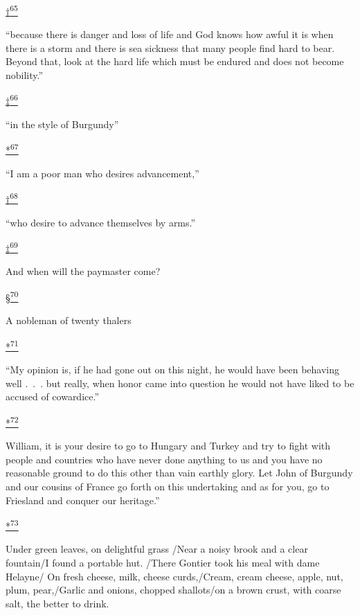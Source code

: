 \protect\hypertarget{23_NOTES.xhtmlux5cux23id_2918}{\protect\hyperlink{10_Chapter_Three__THE_HEROIC_DREAM.xhtmlux5cux23id_2917}{†\textsuperscript{65}}}
``because there is danger and loss of life and God knows how awful it is
when there is a storm and there is sea sickness that many people find
hard to bear. Beyond that, look at the hard life which must be endured
and does not become nobility.''

\protect\hypertarget{23_NOTES.xhtmlux5cux23id_2920}{\protect\hyperlink{10_Chapter_Three__THE_HEROIC_DREAM.xhtmlux5cux23id_2919}{‡\textsuperscript{66}}}
``in the style of Burgundy''

\protect\hypertarget{23_NOTES.xhtmlux5cux23id_2922}{\protect\hyperlink{10_Chapter_Three__THE_HEROIC_DREAM.xhtmlux5cux23id_2921}{*\textsuperscript{67}}}
``I am a poor man who desires advancement,''

\protect\hypertarget{23_NOTES.xhtmlux5cux23id_2924}{\protect\hyperlink{10_Chapter_Three__THE_HEROIC_DREAM.xhtmlux5cux23id_2923}{†\textsuperscript{68}}}
``who desire to advance themselves by arms.''

\protect\hypertarget{23_NOTES.xhtmlux5cux23id_2926}{\protect\hyperlink{10_Chapter_Three__THE_HEROIC_DREAM.xhtmlux5cux23id_2925}{‡\textsuperscript{69}}}
And when will the paymaster come?

\protect\hypertarget{23_NOTES.xhtmlux5cux23id_2928}{\protect\hyperlink{10_Chapter_Three__THE_HEROIC_DREAM.xhtmlux5cux23id_2927}{§\textsuperscript{70}}}
A nobleman of twenty thalers

\protect\hypertarget{23_NOTES.xhtmlux5cux23id_3082}{\protect\hyperlink{10_Chapter_Three__THE_HEROIC_DREAM.xhtmlux5cux23id_3081}{*\textsuperscript{71}}}
``My opinion is, if he had gone out on this night, he would have been
behaving well .~.~. but really, when honor came into question he would
not have liked to be accused of cowardice.''

\protect\hypertarget{23_NOTES.xhtmlux5cux23id_3084}{\protect\hyperlink{10_Chapter_Three__THE_HEROIC_DREAM.xhtmlux5cux23id_3083}{*\textsuperscript{72}}}
William, it is your desire to go to Hungary and Turkey and try to fight
with people and countries who have never done anything to us and you
have no reasonable ground to do this other than vain earthly glory. Let
John of Burgundy and our cousins of France go forth on this undertaking
and as for you, go to Friesland and conquer our heritage.''

\protect\hypertarget{23_NOTES.xhtmlux5cux23id_3086}{\protect\hyperlink{10_Chapter_Three__THE_HEROIC_DREAM.xhtmlux5cux23id_3085}{*\textsuperscript{73}}}
Under green leaves, on delightful grass /Near a noisy brook and a clear
fountain/I found a portable hut. /There Gontier took his meal with dame
Helayne/ On fresh cheese, milk, cheese curds,/Cream, cream cheese,
apple, nut, plum, pear,/Garlic and onions, chopped shallots/on a brown
crust, with coarse salt, the better to drink.

